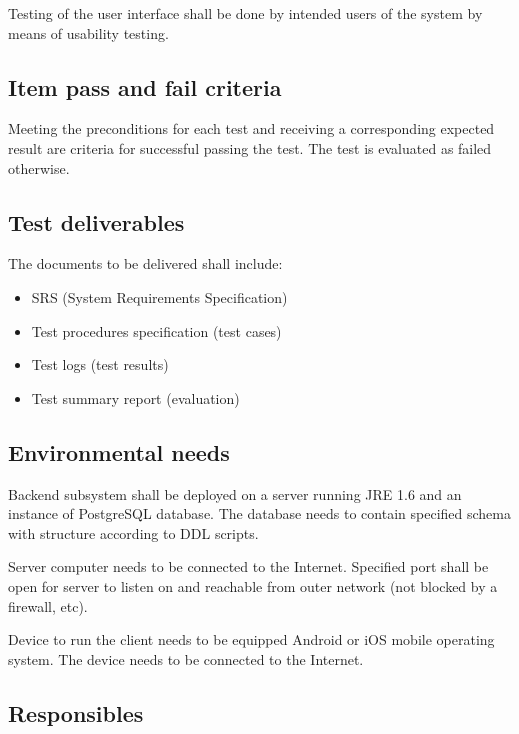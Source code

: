 \documentclass[11pt]{book}
\begin{document}
Testing of the user interface shall be done by intended users of the system by means of usability testing. %

\subsection{Item pass and fail criteria}
Meeting the preconditions for each test and receiving a corresponding expected result are criteria for successful passing the test. The test is evaluated as failed otherwise.


\subsection{Test deliverables}
The documents to be delivered shall include:

\begin{itemize}
	\item SRS (System Requirements Specification)
	\item Test procedures specification (test cases)
	\item Test logs (test results)
	\item Test summary report (evaluation)
\end{itemize}

\subsection{Environmental needs}
Backend subsystem shall be deployed on a server running JRE 1.6 and an instance of PostgreSQL database. The database needs to contain specified schema with structure according to DDL scripts.

Server computer needs to be connected to the Internet. Specified port shall be open for server to listen on and reachable from outer network (not blocked by a firewall, etc). %

Device to run the client needs to be equipped Android or iOS mobile operating system. The device needs to be connected to the Internet.

\subsection{Responsibles}
\end{document}
